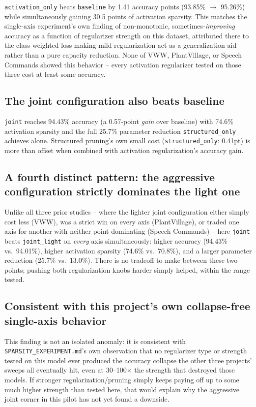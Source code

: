 \documentclass[11pt]{article}
\newcommand{\code}[1]{\texttt{#1}}
\begin{document}
\code{activation\_only} beats \code{baseline} by 1.41 accuracy points (93.85\% $\to$ 95.26\%) while simultaneously gaining 30.5 points of activation sparsity. This matches the single-axis experiment's own finding of non-monotonic, sometimes-\emph{improving} accuracy as a function of regularizer strength on this dataset, attributed there to the class-weighted loss making mild regularization act as a generalization aid rather than a pure capacity reduction. None of VWW, PlantVillage, or Speech Commands showed this behavior -- every activation regularizer tested on those three cost at least some accuracy.

\subsection{The joint configuration also beats baseline}

\code{joint} reaches 94.43\% accuracy (a 0.57-point \emph{gain} over baseline) with 74.6\% activation sparsity and the full 25.7\% parameter reduction \code{structured\_only} achieves alone. Structured pruning's own small cost (\code{structured\_only}: 0.41pt) is more than offset when combined with activation regularization's accuracy gain.

\subsection{A fourth distinct pattern: the aggressive configuration strictly dominates the light one}

Unlike all three prior studies -- where the lighter joint configuration either simply cost less (VWW), was a strict win on every axis (PlantVillage), or traded one axis for another with neither point dominating (Speech Commands) -- here \code{joint} beats \code{joint\_light} on \emph{every} axis simultaneously: higher accuracy (94.43\% vs.\ 94.01\%), higher activation sparsity (74.6\% vs.\ 70.8\%), and a larger parameter reduction (25.7\% vs.\ 13.0\%). There is no tradeoff to make between these two points; pushing both regularization knobs harder simply helped, within the range tested.

\subsection{Consistent with this project's own collapse-free single-axis behavior}

This finding is not an isolated anomaly: it is consistent with \code{SPARSITY\_EXPERIMENT.md}'s own observation that no regularizer type or strength tested on this model ever produced the accuracy collapse the other three projects' sweeps all eventually hit, even at 30--100$\times$ the strength that destroyed those models. If stronger regularization/pruning simply keeps paying off up to some much higher strength than tested here, that would explain why the aggressive joint corner in this pilot has not yet found a downside.
\end{document}
